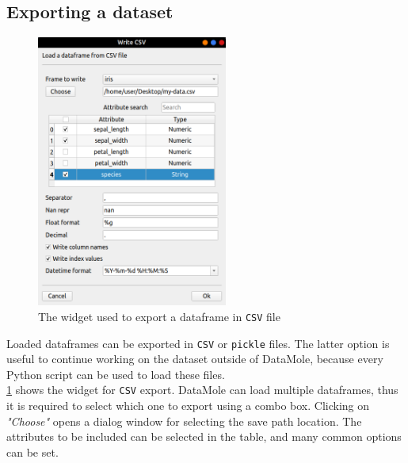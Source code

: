 \subsection{Exporting a dataset}
\begin{figure}
	\centering
	\includegraphics[width=0.56\textwidth]{save-csv}
	\caption{The widget used to export a dataframe in \texttt{CSV} file}
	\label{fig:save-csv}
\end{figure}
Loaded dataframes can be exported in \texttt{CSV} or \texttt{pickle} files. The latter option is useful to continue working on the dataset outside of DataMole, because every Python script can be used to load these files.\\
\cref{fig:save-csv} shows the widget for \texttt{CSV} export. DataMole can load multiple dataframes, thus it is required to select which one to export using a combo box. Clicking on \textit{"Choose"} opens a dialog window for selecting the save path location. The attributes to be included can be selected in the table, and many common options can be set. 


